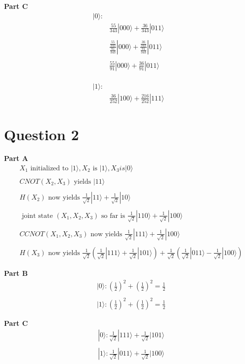 \documentclass{article}
\def\ket#1{|#1\rangle}
\begin{document}
\textbf{Part C} 
\begin{align*}
    \ket{0}:& \\ 
    &\frac{55}{343}\ket{000} + \frac{36}{343}\ket{011}
    \\ \\ 
    &\frac{\frac{55}{343}}{\frac{91}{343}}\ket{000} + \frac{\frac{36}{343}}{\frac{91}{343}}\ket{011}
    \\ \\ 
    &\frac{55}{91}\ket{000} + \frac{36}{91}\ket{011}
    \\ \\ \\ \\ 
    \ket{1}:& \\ 
    &\frac{36}{252}\ket{100} + \frac{216}{252}\ket{111}
\end{align*}

\section{Question 2}
\textbf{Part A}
\begin{align*}
    & X_1 \text{ initialized to } \ket{1}, X_2 \text{ is } \ket{1}, X_3 is \ket{0}
    \\ \\ 
    & CNOT(X_2, X_3) \text{ yields } \ket{11}
    \\ \\ 
    & H(X_2) \text{ now yields } \frac{1}{\sqrt{2}}\ket{11} + \frac{1}{\sqrt{2}}\ket{10}
    \\ \\ 
    &\text{ joint state } (X_1, X_2, X_3) \text{ so far is } \frac{1}{\sqrt{2}}\ket{110} + \frac{1}{\sqrt{2}}\ket{100}
    \\ \\ 
    & CCNOT(X_1, X_2, X_3) \text{ now yields } \frac{1}{\sqrt{2}}\ket{111} + \frac{1}{\sqrt{2}}\ket{100}
    \\ \\ 
    & H(X_3) \text{ now yields } \frac{1}{\sqrt{2}}(\frac{1}{\sqrt{2}}\ket{111} + \frac{1}{\sqrt{2}}\ket{101}) + \frac{1}{\sqrt{2}}(\frac{1}{\sqrt{2}}\ket{011} - \frac{1}{\sqrt{2}}\ket{100})
\end{align*}

\textbf{Part B}
\begin{align*}
& \ket{0}: (\frac{1}{2})^2 + (\frac{1}{2})^2 = \frac{1}{2}
\\ \\ 
& \ket{1}: (\frac{1}{2})^2 + (\frac{1}{2})^2 = \frac{1}{2}
\end{align*}

\textbf{Part C} 
\begin{align*}
    & \ket{0}: \frac{1}{\sqrt{2}}\ket{111} + \frac{1}{\sqrt{2}}\ket{101}
    \\ \\ 
    & \ket{1}: \frac{1}{\sqrt{2}}\ket{011} + \frac{1}{\sqrt{2}}\ket{100}
\end{align*}
\end{document}
